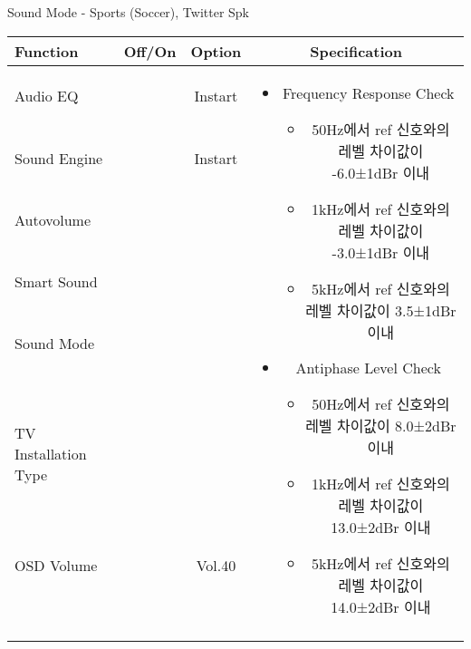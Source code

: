 \begin{frame}[t]{Sound Mode - Sports (Soccer), Twitter Spk}
\begin{tiny}
\begin{tabular}{@{}lccc@{}}
\toprule
Function & Off/On & Option & Specification \\
\midrule
Audio EQ & \color{black}{Off} & Instart &
\multirow{10}{60mm}{
\begin{itemize}
\item Frequency Response Check
	\begin{itemize}
	\item 50Hz에서 ref 신호와의 레벨 차이값이 -6.0±1dBr 이내
	\item 1kHz에서 ref 신호와의 레벨 차이값이 -3.0±1dBr 이내
	\item 5kHz에서 ref 신호와의 레벨 차이값이 3.5±1dBr 이내
	\end{itemize}
\item Antiphase Level Check
	\begin{itemize}
	\item 50Hz에서 ref 신호와의 레벨 차이값이 8.0±2dBr 이내
	\item 1kHz에서 ref 신호와의 레벨 차이값이 13.0±2dBr 이내
	\item 5kHz에서 ref 신호와의 레벨 차이값이 14.0±2dBr 이내
	\end{itemize}
\end{itemize}
} \\
Sound Engine & \color{blue}{On} & Instart & \\
Autovolume & \color{black}{Off} & & \\
Smart Sound & \color{black}{Off} & & \\
Sound Mode & \color{blue}{On} & \color{blue}{Sports} & \\
TV Installation Type & \color{blue}{On} & \color{black}{Standtype1} & \\
OSD Volume & \color{blue}{On} & Vol.40 & \\
& & & \\
& & & \\
& & & \\
& & & \\
\midrule
\end{tabular}
\end{tiny}


\end{frame}